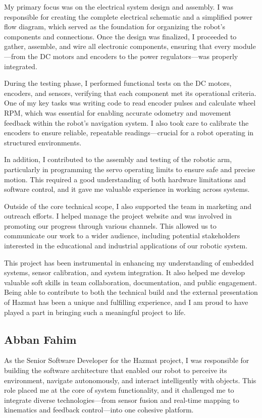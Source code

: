 \documentclass{article}
\begin{document}
\begin{appendices}
My primary focus was on the electrical system design and assembly. I was responsible for creating the complete electrical schematic and a simplified power flow diagram, which served as the foundation for organizing the robot's components and connections. Once the design was finalized, I proceeded to gather, assemble, and wire all electronic components, ensuring that every module---from the DC motors and encoders to the power regulators---was properly integrated.

During the testing phase, I performed functional tests on the DC motors, encoders, and sensors, verifying that each component met its operational criteria. One of my key tasks was writing code to read encoder pulses and calculate wheel RPM, which was essential for enabling accurate odometry and movement feedback within the robot's navigation system. I also took care to calibrate the encoders to ensure reliable, repeatable readings---crucial for a robot operating in structured environments.

In addition, I contributed to the assembly and testing of the robotic arm, particularly in programming the servo operating limits to ensure safe and precise motion. This required a good understanding of both hardware limitations and software control, and it gave me valuable experience in working across systems.

Outside of the core technical scope, I also supported the team in marketing and outreach efforts. I helped manage the project website and was involved in promoting our progress through various channels. This allowed us to communicate our work to a wider audience, including potential stakeholders interested in the educational and industrial applications of our robotic system.

This project has been instrumental in enhancing my understanding of embedded systems, sensor calibration, and system integration. It also helped me develop valuable soft skills in team collaboration, documentation, and public engagement. Being able to contribute to both the technical build and the external presentation of Hazmat has been a unique and fulfilling experience, and I am proud to have played a part in bringing such a meaningful project to life.

\subsection*{Abban Fahim}

As the Senior Software Developer for the Hazmat project, I was responsible for building the software architecture that enabled our robot to perceive its environment, navigate autonomously, and interact intelligently with objects. This role placed me at the core of system functionality, and it challenged me to integrate diverse technologies---from sensor fusion and real-time mapping to kinematics and feedback control---into one cohesive platform.


\end{appendices}
\end{document}
